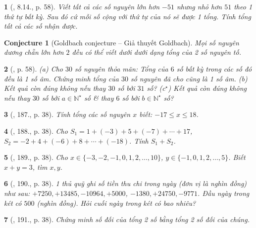 \documentclass{article}
\newtheorem{baitoan}{}
\newtheorem{conjecture}{Conjecture}
\begin{document}
\begin{baitoan}[\cite{Binh_boi_duong_Toan_6_tap_1}, 8.14., p. 58]
	Viết tất cả các số nguyên lớn hơn $-51$ nhưng nhỏ hơn $51$ theo 1 thứ tự bất kỳ. Sau đó cứ mỗi số cộng với thứ tự của nó sẽ được 1 tổng. Tính tổng tất cả các số nhận được.
\end{baitoan}

\begin{conjecture}[Goldbach conjecture -- Giả thuyết Goldbach]
	Mọi số nguyên dương chẵn lớn hơn $2$ đều có thể viết dưới dưới dạng tổng của 2 số nguyên tố.
\end{conjecture}

\begin{baitoan}[\cite{Binh_boi_duong_Toan_6_tap_1}, p. 58]
	(a) Cho $30$ số nguyên thỏa mãn: Tổng của $6$ số bất kỳ trong các số đó đều là 1 số âm. Chứng minh tổng của $30$ số nguyên đã cho cũng là 1 số âm. (b) Kết quả còn đúng không nếu thay $30$ số bởi $31$ số? (c${}^\star$) Kết quả còn đúng không nếu thay $30$ số bởi $a\in\mathbb{N}^\star$ số \& thay $6$ số bởi $b\in\mathbb{N}^\star$ số?
\end{baitoan}

\begin{baitoan}[\cite{Tuyen_Toan_6}, 187., p. 38]
	Tính tổng các số nguyên $x$ biết: $-17\le x\le18$.
\end{baitoan}

\begin{baitoan}[\cite{Tuyen_Toan_6}, 188., p. 38]
	Cho $S_1 = 1 + (-3) + 5 + (-7) + \cdots + 17$, $S_2 = -2 + 4 + (-6) + 8 + \cdots + (-18)$. Tính $S_1 + S_2$.
\end{baitoan}

\begin{baitoan}[\cite{Tuyen_Toan_6}, 189., p. 38]
	Cho $x\in\{-3,-2,-1,0,1,2,\ldots,10\}$, $y\in\{-1,0,1,2,\ldots,5\}$. Biết $x + y = 3$, tìm $x,y$.
\end{baitoan}

\begin{baitoan}[\cite{Tuyen_Toan_6}, 190., p. 38]
	1 thủ quỹ ghi số tiền thu chi trong ngày (đơn vị là nghìn đồng) như sau: $+7250,+13485,-10964,+5000$, $-1380,+24750,-9771$. Đầu ngày trong két có $500$ (nghìn đồng). Hỏi cuối ngày trong két có bao nhiêu?
\end{baitoan}

\begin{baitoan}[\cite{Tuyen_Toan_6}, 191., p. 38]
	Chứng minh số đối của tổng 2 số bằng tổng 2 số đối của chúng.
\end{baitoan}
\end{document}
